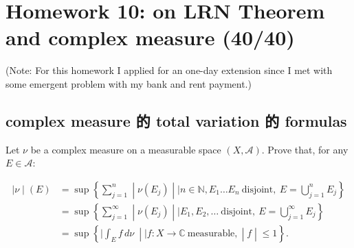 \chapter{Homework 10: on LRN Theorem and complex measure (40/40)}\label{homework-10-on-lrn-theorem-and-complex-measure-4040}

(Note: For this homework I applied for an one-day extension since I met with some emergent problem with my bank and rent payment.)

\section{complex measure 的 total variation 的 formulas}\label{complex-measure-ux7684-total-variation-ux7684-formulas}

Let \(\nu\) be a complex measure on a measurable space \((X,\mathcal{A})\). Prove that, for any \(E \in \mathcal{A}\):

\[\begin{matrix}
\left. |\nu \middle| (E) \right. & {= \sup\left\{ \sum\limits_{j = 1}^{n} \middle| \nu(E_{j}) \middle| \mid n \in \mathbb{N},E_{1}\ldots E_{n}\ \text{disjoint},\ E = \bigcup\limits_{j = 1}^{n}E_{j} \right\}} \\
 & {= \sup\left\{ \sum\limits_{j = 1}^{\infty} \middle| \nu(E_{j}) \middle| \mid E_{1},E_{2},\ldots\ \text{disjoint},\ E = \bigcup\limits_{j = 1}^{\infty}E_{j} \right\}} \\
 & {= \sup\left\{ |\int_{E}f\, d\nu\  \middle| \mid f:X\rightarrow\mathbb{C}\ \text{measurable}, \middle| f \middle| \leq 1 \right\}.}
\end{matrix}\]

